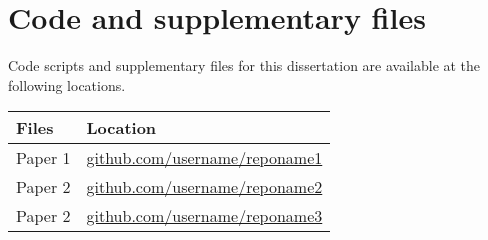 \documentclass[12pt, letterpaper]{report}
\begin{document}
\chapter*{Code and supplementary files}  %
Code scripts and supplementary files for this dissertation are available at the following locations.

\begin{center}
\begin{tabular}{ll} \toprule
Files & Location \\ \midrule
Paper 1 & \href{https://www.github.com/username/reponame1}{github.com/username/reponame1} \\
Paper 2 & \href{https://www.github.com/username/reponame2}{github.com/username/reponame2} \\
Paper 2 & \href{https://www.github.com/username/reponame3}{github.com/username/reponame3} \\ \bottomrule
\end{tabular}
\end{center}

\newpage
\thispagestyle{empty}

\end{document}
